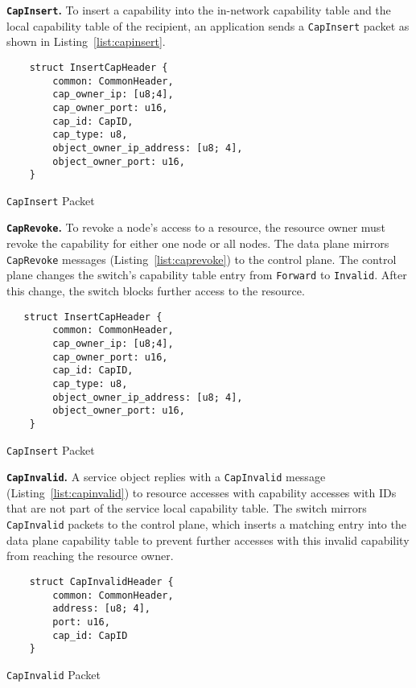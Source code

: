 

\textbf{\texttt{CapInsert}.}
To insert a capability into the in-network capability table and the local capability table of the recipient, an application sends a \texttt{CapInsert} packet as shown in Listing~\ref{list:capinsert}.

\begin{listing}[H]
  \begin{verbatim}
    struct InsertCapHeader {
        common: CommonHeader,
        cap_owner_ip: [u8;4],
        cap_owner_port: u16,
        cap_id: CapID,
        cap_type: u8,
        object_owner_ip_address: [u8; 4],
        object_owner_port: u16,
    }
  \end{verbatim}
  \caption{\label{list:capinsert} \texttt{CapInsert} Packet}
\end{listing}

\textbf{\texttt{CapRevoke}.}
To revoke a node's access to a resource, the resource owner must revoke the capability for either one node or all nodes. The data plane mirrors \texttt{CapRevoke} messages (Listing~\ref{list:caprevoke}) to the control plane. The control plane changes the switch's capability table entry from \texttt{Forward} to \texttt{Invalid}. After this change, the switch blocks further access to the resource.

\begin{listing}[H]
  \begin{verbatim}
   struct InsertCapHeader {
        common: CommonHeader,
        cap_owner_ip: [u8;4],
        cap_owner_port: u16,
        cap_id: CapID,
        cap_type: u8,
        object_owner_ip_address: [u8; 4],
        object_owner_port: u16,
    }
  \end{verbatim}
  \caption{\label{list:caprevoke} \texttt{CapInsert} Packet}
\end{listing}

\textbf{\texttt{CapInvalid}.}
A service object replies with a \texttt{CapInvalid} message (Listing~\ref{list:capinvalid}) to resource accesses with capability accesses with IDs that are not part of the service local capability table. The switch mirrors \texttt{CapInvalid} packets to the control plane, which inserts a matching entry into the data plane capability table to prevent further accesses with this invalid capability from reaching the resource owner.


\begin{listing}[H]
  \begin{verbatim}
    struct CapInvalidHeader {
        common: CommonHeader,
        address: [u8; 4],
        port: u16,
        cap_id: CapID
    }
   \end{verbatim}
  \caption{\label{list:capinvalid} \texttt{CapInvalid} Packet}
\end{listing}

